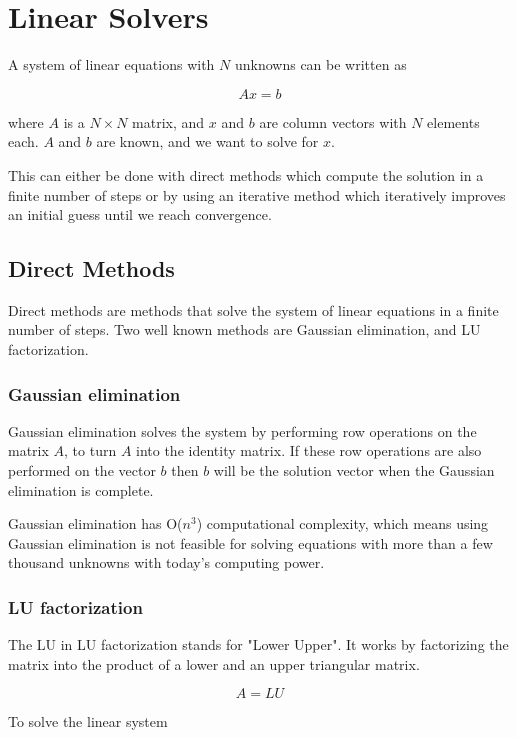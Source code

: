 \section{Linear Solvers}

A system of linear equations with $N$ unknowns can be written as 

$$Ax = b$$

where $A$ is a $N \times N$ matrix, and $x$ and $b$ are column vectors with $N$ 
elements each. $A$ and $b$ are known, and we want to solve for $x$.

This can either be done with direct methods which compute the solution in a finite 
number of steps or by using an iterative method which iteratively improves an initial 
guess until we reach convergence. 

\subsection{Direct Methods}

Direct methods are methods that solve the system of linear equations in a finite
number of steps. Two well known methods are Gaussian elimination, and LU factorization.

\subsubsection{Gaussian elimination}

Gaussian elimination solves the system by performing row operations on the matrix 
$A$, to turn $A$ into the identity matrix. If these row operations are also performed 
on the vector $b$ then $b$ will be the solution vector when the Gaussian elimination 
is complete.

Gaussian elimination has O($n^3$) computational complexity, which means using 
Gaussian elimination is not feasible for solving equations with more than a few 
thousand unknowns with today's computing power.

\subsubsection{LU factorization}

The LU in LU factorization stands for "Lower Upper". It works by factorizing the 
matrix into the product of a lower and an upper triangular matrix. 

$$A = LU$$

To solve the linear system 

